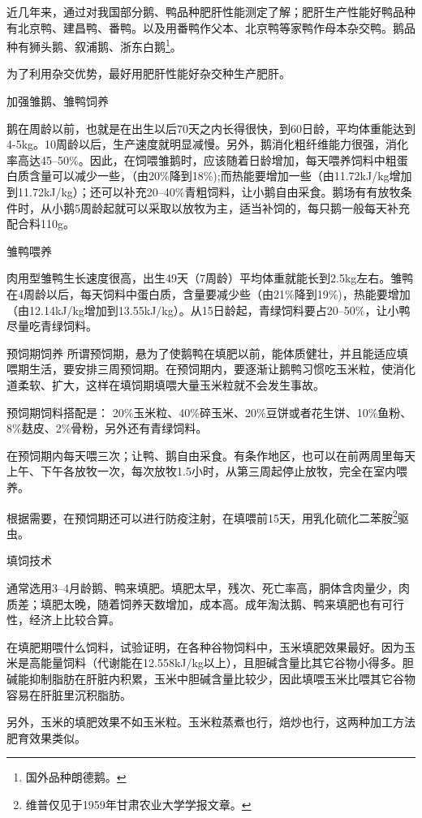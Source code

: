 \documentclass{ctexbook}
\begin{document}
近几年来，通过对我国部分鹅、鸭品种肥肝性能测定了解；肥肝生产性能好鸭品种有北京鸭、建昌鸭、番鸭。以及用番鸭作父本、北京鸭等家鸭作母本杂交鸭。鹅品种有狮头鹅、叙浦鹅、浙东白鹅\footnote{国外品种朗德鹅。}。

为了利用杂交优势，最好用肥肝性能好杂交种生产肥肝。

加强雏鹅、雏鸭饲养

鹅在周龄以前，也就是在出生以后70天之内长得很快，到60日龄，平均体重能达到4-5kg。10周龄以后，生产速度就明显减慢。另外，鹅消化粗纤维能力很强，消化率高达45--50\%。因此，在饲喂雏鹅时，应该随着日龄增加，每天喂养饲料中粗蛋白质含量可以减少一些，（由20\%降到18\%);而热能要增加一些（由11.72kJ/kg增加到11.72kJ/kg）；还可以补充20--40\%青粗饲料，让小鹅自由采食。鹅场有有放牧条件时，从小鹅5周龄起就可以采取以放牧为主，适当补饲的，每只鹅一般每天补充配合料110g。

雏鸭喂养

肉用型雏鸭生长速度很高，出生49天（7周龄）平均体重就能长到2.5kg左右。雏鸭在4周龄以后，每天饲料中蛋白质，含量要减少些（由21\%降到19\%)，热能要增加（由12.14kJ/kg增加到13.55kJ/kg）。从15日龄起，青绿饲料要占20--50\%，让小鸭尽量吃青绿饲料。

预饲期饲养
所谓预饲期，悬为了使鹅鸭在填肥以前，能体质健壮，并且能适应填喂期生活，要安排三周预饲期。在预饲期内，要逐渐让鹅鸭习惯吃玉米粒，使消化道柔软、扩大，这样在填饲期填喂大量玉米粒就不会发生事故。

预饲期饲料搭配是：
20\%玉米粒、40\%碎玉米、20\%豆饼或者花生饼、10\%鱼粉、8\%麸皮、2\%骨粉，另外还有青绿饲料。

在预饲期内每天喂三次；让鸭、鹅自由采食。有条作地区，也可以在前两周里每天上午、下午各放牧一次，每次放牧1.5小时，从第三周起停止放牧，完全在室内喂养。

根据需要，在预饲期还可以进行防疫注射，在填喂前15天，用乳化硫化二苯胺\footnote{维普仅见于1959年甘肃农业大学学报文章。}驱虫。

填饲技术

通常选用3--4月龄鹅、鸭来填肥。填肥太早，残次、死亡率高，胴体含肉量少，肉质差；填肥太晚，随着饲养天数增加，成本高。成年淘汰鹅、鸭来填肥也有可行性，经济上比较合算。

在填肥期喂什么饲料，试验证明，在各种谷物饲料中，玉米填肥效果最好。因为玉米是高能量饲料（代谢能在12.558kJ/kg以上），且胆碱含量比其它谷物小得多。胆碱能抑制脂肪在肝脏内积累，玉米中胆碱含量比较少，因此填喂玉米比喂其它谷物容易在肝脏里沉积脂肪。

另外，玉米的填肥效果不如玉米粒。玉米粒蒸煮也行，焙炒也行，这两种加工方法肥育效果类似。
\end{document}
